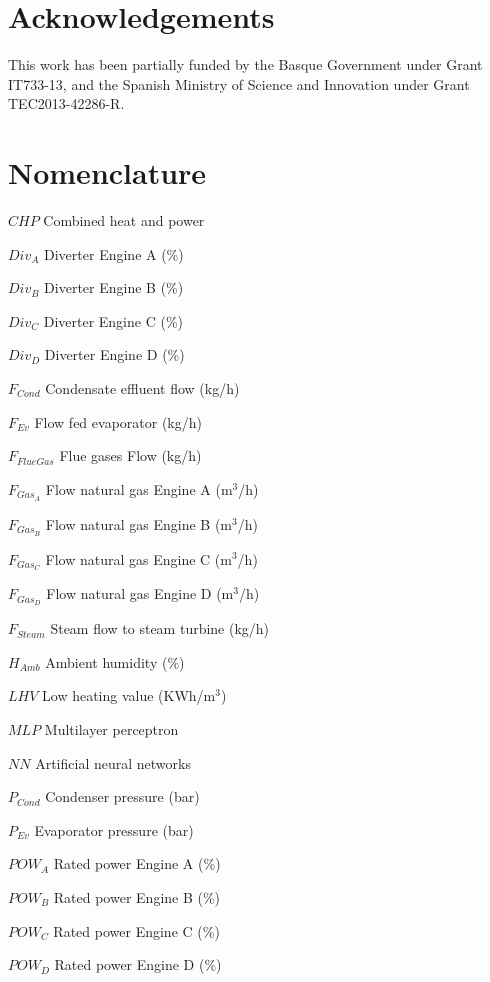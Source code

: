 \documentclass[preprint,12pt]{elsarticle}
\begin{document}

\section{Acknowledgements}
This work has been partially funded by the Basque Government under Grant IT733-13, and the Spanish Ministry of Science and Innovation under Grant TEC2013-42286-R.


\section{Nomenclature}

\par $CHP$	Combined heat and power
\par $Div_A$	Diverter Engine A (\%)
\par $Div_B$	Diverter Engine B (\%)
\par $Div_C$	Diverter Engine C (\%)
\par $Div_D$	Diverter Engine D (\%)
\par $F_{Cond}$	Condensate effluent flow (kg/h) 
\par $F_{Ev}$	Flow fed evaporator (kg/h) 
\par $F_{FlueGas}$	Flue gases Flow (kg/h) 
\par $F_{Gas_A}$	Flow natural gas Engine A (m$^3$/h) 
\par $F_{Gas_B}$	Flow natural gas Engine B (m$^3$/h) 
\par $F_{Gas_C}$	Flow natural gas Engine C (m$^3$/h) 
\par $F_{Gas_D}$	Flow natural gas Engine D (m$^3$/h) 
\par $F_{Steam}$	Steam flow to steam turbine (kg/h)
\par $H_{Amb}$	Ambient humidity (\%)
\par $LHV$	Low heating value (KWh/m$^3$)
\par $MLP$ Multilayer perceptron
\par $NN$	Artificial neural networks 
\par $P_{Cond}$	Condenser pressure (bar)
\par $P_{Ev}$	Evaporator pressure (bar) 
\par $POW_A$	Rated power Engine A (\%) 
\par $POW_B$	Rated power Engine B (\%) 
\par $POW_C$	Rated power Engine C (\%) 
\par $POW_D$	Rated power Engine D (\%) 
\end{document}

